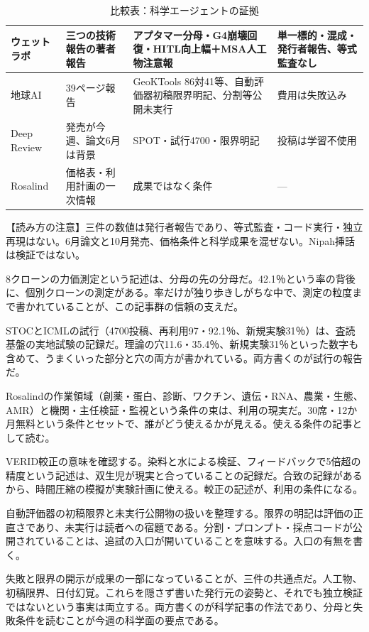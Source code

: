 \documentclass[lualatex,a4paper,10pt]{jlreq}
\begin{document}
\begin{table}[htbp]\centering\footnotesize
\caption{比較表：科学エージェントの証拠}
\begin{tabularx}{0.96\linewidth}{@{}lXXX@{}}
\toprule
ウェットラボ & 三つの技術報告の著者報告 & アプタマー分母・G4崩壊回復・HITL向上幅＋MSA人工物注意報 & 単一標的・混成・発行者報告、等式監査なし \\
\midrule
地球AI & 39ページ報告 & GeoKTools 86対41等、自動評価器初稿限界明記、分割等公開未実行 & 費用は失敗込み \\
\midrule
Deep Review & 発売が今週、論文6月は背景 & SPOT・試行4700・限界明記 & 投稿は学習不使用 \\
\midrule
Rosalind & 価格表・利用計画の一次情報 & 成果ではなく条件 & --- \\
\bottomrule
\end{tabularx}
\end{table}
\begin{tcolorbox}[colback=SurveySoft,colframe=SurveyRule,arc=1mm,boxrule=0.4pt,left=2mm,right=2mm]
【読み方の注意】三件の数値は発行者報告であり、等式監査・コード実行・独立再現はない。6月論文と10月発売、価格条件と科学成果を混ぜない。Nipah挿話は検証ではない。
\end{tcolorbox}
8クローンの力価測定という記述は、分母の先の分母だ。42.1％という率の背後に、個別クローンの測定がある。率だけが独り歩きしがちな中で、測定の粒度まで書かれていることが、この記事群の信頼の支えだ。

STOCとICMLの試行（4700投稿、再利用97・92.1％、新規実験31％）は、査読基盤の実地試験の記録だ。理論の穴11.6・35.4％、新規実験31％といった数字も含めて、うまくいった部分と穴の両方が書かれている。両方書くのが試行の報告だ。

Rosalindの作業領域（創薬・蛋白、診断、ワクチン、遺伝・RNA、農業・生態、AMR）と機関・主任検証・監視という条件の束は、利用の現実だ。30席・12か月無料という条件とセットで、誰がどう使えるかが見える。使える条件の記事として読む。

VERID較正の意味を確認する。染料と水による検証、フィードバックで5倍超の精度という記述は、双生児が現実と合っていることの記録だ。合致の記録があるから、時間圧縮の模擬が実験計画に使える。較正の記述が、利用の条件になる。

自動評価器の初稿限界と未実行公開物の扱いを整理する。限界の明記は評価の正直さであり、未実行は読者への宿題である。分割・プロンプト・採点コードが公開されていることは、追試の入口が開いていることを意味する。入口の有無を書く。

失敗と限界の開示が成果の一部になっていることが、三件の共通点だ。人工物、初稿限界、日付幻覚。これらを隠さず書いた発行元の姿勢と、それでも独立検証ではないという事実は両立する。両方書くのが科学記事の作法であり、分母と失敗条件を読むことが今週の科学面の要点である。
\end{document}
